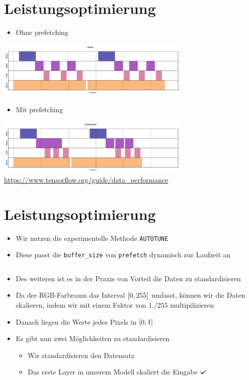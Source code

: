 \documentclass[t]{beamer}
\def\checkmark{\tikz\fill[scale=0.4](0,.35) -- (.25,0) -- (1,.7) -- (.25,.15) -- cycle;}
\newcommand\pycode[1]{\inputminted[frame=lines, framesep=2mm, fontsize=\normalsize]{python}{#1}}
\begin{document}
\section{Leistungsoptimierung}
\begin{frame}
    \begin{itemize}
        \item Ohne prefetching
    \end{itemize}
    \includegraphics[width=0.7\textwidth]{teach-plots/naive-prefetching-crop.pdf}
    \begin{itemize}
        \item Mit prefetching
    \end{itemize}
    \includegraphics[width=0.7\textwidth]{teach-plots/prefetched-crop.pdf}
    \large\href{https://www.tensorflow.org/guide/data_performance}{https://www.tensorflow.org/guide/data\_performance}
\end{frame}

\section{Leistungsoptimierung}
\begin{frame}
    \begin{itemize}
        \item Wir nutzen die experimentelle Methode \texttt{AUTOTUNE}
        \item Diese passt die \texttt{buffer\_size} von \texttt{prefetch} dynamisch zur Laufzeit an
        \pycode{./code-snippets/dataset-optimize.py}
        \item Des weiteren ist es in der Praxis von Vorteil die Daten zu standardisieren
        \item Da der RGB-Farbraum das Interval \(\interval{0}{255}\) umfasst, können wir die Daten skalieren, indem wir mit einem Faktor von \(1./255\) multipilizieren
        \item Danach liegen die Werte jedes Pixels in \(\interval{0}{1}\)
        \newline  
        \item Es gibt nun zwei Möglichkeiten zu standardisieren
        \begin{itemize}
            \item Wir standardisieren den Datensatz
            \item Das erste Layer in unserem Modell skaliert die Eingabe \textcolor{green}{\(\checkmark\)}
        \end{itemize}
    \end{itemize}
\end{frame}
\end{document}
